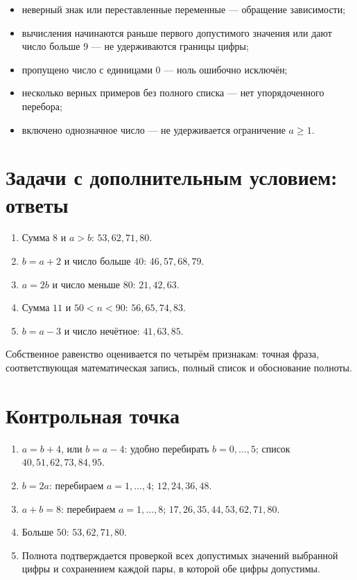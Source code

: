 \begin{teacherbox}
  \begin{itemize}
    \item неверный знак или переставленные переменные --- обращение зависимости;
    \item вычисления начинаются раньше первого допустимого значения или дают
      число больше \(9\) --- не удерживаются границы цифры;
    \item пропущено число с единицами \(0\) --- ноль ошибочно исключён;
    \item несколько верных примеров без полного списка --- нет упорядоченного перебора;
    \item включено однозначное число --- не удерживается ограничение \(a\geq1\).
  \end{itemize}
\end{teacherbox}

\section{Задачи с дополнительным условием: ответы}

\begin{enumerate}
  \item Сумма \(8\) и \(a>b\): \(53,62,71,80\).
  \item \(b=a+2\) и число больше \(40\): \(46,57,68,79\).
  \item \(a=2b\) и число меньше \(80\): \(21,42,63\).
  \item Сумма \(11\) и \(50<n<90\): \(56,65,74,83\).
  \item \(b=a-3\) и число нечётное: \(41,63,85\).
\end{enumerate}

Собственное равенство оценивается по четырём признакам: точная фраза,
соответствующая математическая запись, полный список и обоснование полноты.

\section{Контрольная точка}

\begin{enumerate}
  \item \(a=b+4\), или \(b=a-4\): удобно перебирать \(b=0,\ldots,5\);
    список \(40,51,62,73,84,95\).
  \item \(b=2a\): перебираем \(a=1,\ldots,4\); \(12,24,36,48\).
  \item \(a+b=8\): перебираем \(a=1,\ldots,8\);
    \(17,26,35,44,53,62,71,80\).
  \item Больше \(50\): \(53,62,71,80\).
  \item Полнота подтверждается проверкой всех допустимых значений выбранной
    цифры и сохранением каждой пары, в которой обе цифры допустимы.
\end{enumerate}

